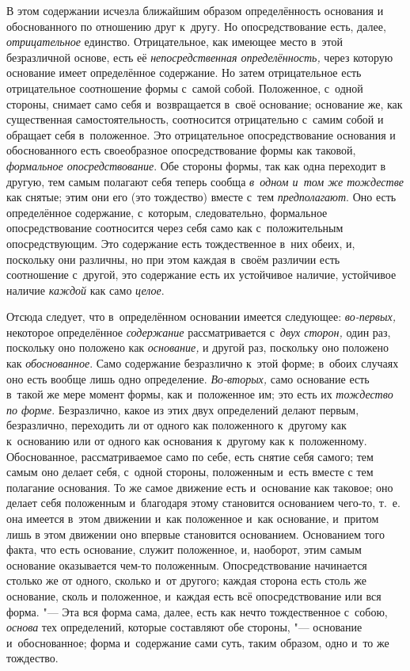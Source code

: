 В этом содержании исчезла ближайшим образом определённость основания и
обоснованного по отношению друг к~другу. Но опосредствование есть, далее,
{\em отрицательное} единство. Отрицательное, как имеющее место в~этой
безразличной основе, есть её {\em непосредственная определённость,} через
которую основание имеет определённое содержание. Но затем отрицательное есть
отрицательное соотношение формы с~самой собой. Положенное, с~одной стороны,
снимает само себя и~возвращается в~своё основание; основание же, как
существенная самостоятельность, соотносится отрицательно с~самим собой и
обращает себя в~положенное. Это отрицательное опосредствование основания и
обоснованного есть своеобразное опосредствование формы как таковой,
{\em формальное опосредствование}. Обе стороны формы, так как одна переходит в
другую, тем самым полагают себя теперь сообща {\em в~одном и~том же тождестве}
как снятые; этим они его (это тождество) вместе с~тем {\em предполагают}. Оно
есть определённое содержание, с~которым, следовательно, формальное
опосредствование соотносится через себя само как с~положительным
опосредствующим. Это содержание есть тождественное в~них обеих, и, поскольку
они различны, но при этом каждая в~своём различии есть соотношение с~другой,
это содержание есть их устойчивое наличие, устойчивое наличие {\em каждой} как
само {\em целое}.

Отсюда следует, что в~определённом основании имеется следующее:
{\em во-первых,} некоторое определённое {\em содержание} рассматривается
с~{\em двух сторон,} один раз, поскольку оно положено как {\em основание,} и
другой раз, поскольку оно положено как {\em обоснованное}. Само содержание
безразлично к~этой форме; в~обоих случаях оно есть вообще лишь одно
определение. {\em Во-вторых,} само основание есть в~такой же мере момент формы,
как и~положенное им; это есть их {\em тождество по форме}. Безразлично, какое
из этих двух определений делают первым, безразлично, переходить ли от одного
как положенного к~другому как к~основанию или от одного как основания к~другому
как к~положенному. Обоснованное, рассматриваемое само по себе, есть снятие себя
самого; тем самым оно делает себя, с~одной стороны, положенным и~есть вместе с
тем полагание основания. То же самое движение есть и~основание как таковое; оно
делает себя положенным и~благодаря этому становится основанием чего-то, т.~е.
она имеется в~этом движении и~как положенное и~как основание, и~притом лишь в
этом движении оно впервые становится основанием. Основанием того факта, что
есть основание, служит положенное, и, наоборот, этим самым основание
оказывается чем-то положенным. Опосредствование начинается столько же от
одного, сколько и~от другого; каждая сторона есть столь же основание, сколь и
положенное, и~каждая есть всё опосредствование или вся форма. "--- Эта вся
форма сама, далее, есть как нечто тождественное с~собою, {\em основа} тех
определений, которые составляют обе стороны, "--- основание и~обоснованное;
форма и~содержание сами суть, таким образом, одно и~то же тождество.

